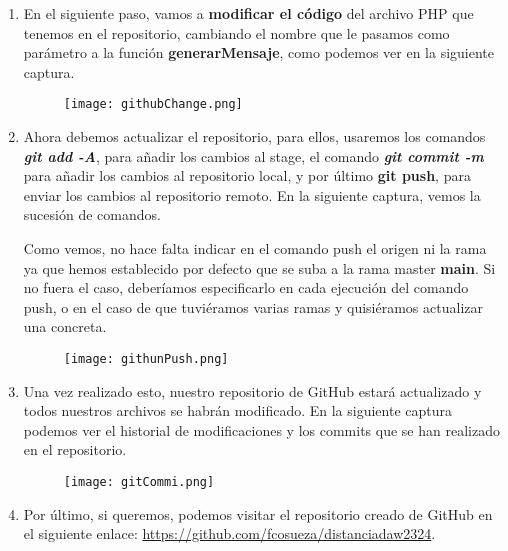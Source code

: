 \begin{enumerate}
    \item En el siguiente paso, vamos a \textbf{modificar el código} del archivo PHP que tenemos en el repositorio, cambiando el nombre que le pasamos como parámetro a la función \textbf{generarMensaje}, como podemos ver en la siguiente captura.

    \begin{figure}[H]
        \centering
        \texttt{[image: githubChange.png]}
    \end{figure}

     \item Ahora debemos actualizar el repositorio, para ellos, usaremos los comandos \textbf{\textit{git add -A}}, para añadir los cambios al stage, el comando \textbf{\textit{git commit -m}} para añadir los cambios al repositorio local, y por último \textbf{git push}, para enviar los cambios al repositorio remoto. En la siguiente captura, vemos la sucesión de comandos.

     Como vemos, no hace falta indicar en el comando push el origen ni la rama ya que hemos establecido por defecto que se suba a la rama master \textbf{main}. Si no fuera el caso, deberíamos especificarlo en cada ejecución del comando push, o en el caso de que tuviéramos varias ramas y quisiéramos actualizar una concreta.

         \begin{figure}[H]
         \centering
         \texttt{[image: githunPush.png]}
     \end{figure}

    \item Una vez realizado esto, nuestro repositorio de GitHub estará actualizado y todos nuestros archivos se habrán modificado. En la siguiente captura podemos ver el historial de modificaciones y los commits que se han realizado en el repositorio.

    \begin{figure}[H]
        \centering
        \texttt{[image: gitCommi.png]}
    \end{figure}


    \item Por último, si queremos, podemos visitar el repositorio creado de GitHub en el siguiente enlace: \url{https://github.com/fcosueza/distanciadaw2324}.
\end{enumerate}

%

